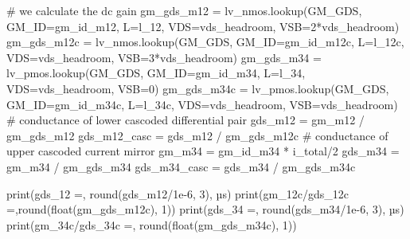 \documentclass[
  a4paper,
  DIV=11,
  numbers=noendperiod]{scrartcl}
\newenvironment{Shaded}{\begin{snugshade}}{\end{snugshade}}
\newcommand{\BuiltInTok}[1]{\textcolor[rgb]{0.00,0.23,0.31}{#1}}
\newcommand{\CommentTok}[1]{\textcolor[rgb]{0.37,0.37,0.37}{#1}}
\newcommand{\DecValTok}[1]{\textcolor[rgb]{0.68,0.00,0.00}{#1}}
\newcommand{\FloatTok}[1]{\textcolor[rgb]{0.68,0.00,0.00}{#1}}
\newcommand{\NormalTok}[1]{\textcolor[rgb]{0.00,0.23,0.31}{#1}}
\newcommand{\OperatorTok}[1]{\textcolor[rgb]{0.37,0.37,0.37}{#1}}
\newcommand{\StringTok}[1]{\textcolor[rgb]{0.13,0.47,0.30}{#1}}
\begin{document}
\begin{tcolorbox}
\begin{Shaded}
\begin{Highlighting}[]
\CommentTok{\# we calculate the dc gain}
\NormalTok{gm\_gds\_m12 }\OperatorTok{=}\NormalTok{ lv\_nmos.lookup(}\StringTok{\textquotesingle{}GM\_GDS\textquotesingle{}}\NormalTok{, GM\_ID}\OperatorTok{=}\NormalTok{gm\_id\_m12, L}\OperatorTok{=}\NormalTok{l\_12, VDS}\OperatorTok{=}\NormalTok{vds\_headroom, VSB}\OperatorTok{=}\DecValTok{2}\OperatorTok{*}\NormalTok{vds\_headroom)}
\NormalTok{gm\_gds\_m12c }\OperatorTok{=}\NormalTok{ lv\_nmos.lookup(}\StringTok{\textquotesingle{}GM\_GDS\textquotesingle{}}\NormalTok{, GM\_ID}\OperatorTok{=}\NormalTok{gm\_id\_m12c, L}\OperatorTok{=}\NormalTok{l\_12c, VDS}\OperatorTok{=}\NormalTok{vds\_headroom, VSB}\OperatorTok{=}\DecValTok{3}\OperatorTok{*}\NormalTok{vds\_headroom)}
\NormalTok{gm\_gds\_m34 }\OperatorTok{=}\NormalTok{ lv\_pmos.lookup(}\StringTok{\textquotesingle{}GM\_GDS\textquotesingle{}}\NormalTok{, GM\_ID}\OperatorTok{=}\NormalTok{gm\_id\_m34, L}\OperatorTok{=}\NormalTok{l\_34, VDS}\OperatorTok{=}\NormalTok{vds\_headroom, VSB}\OperatorTok{=}\DecValTok{0}\NormalTok{)}
\NormalTok{gm\_gds\_m34c }\OperatorTok{=}\NormalTok{ lv\_pmos.lookup(}\StringTok{\textquotesingle{}GM\_GDS\textquotesingle{}}\NormalTok{, GM\_ID}\OperatorTok{=}\NormalTok{gm\_id\_m34c, L}\OperatorTok{=}\NormalTok{l\_34c, VDS}\OperatorTok{=}\NormalTok{vds\_headroom, VSB}\OperatorTok{=}\NormalTok{vds\_headroom)}
\CommentTok{\# conductance of lower cascoded differential pair}
\NormalTok{gds\_m12 }\OperatorTok{=}\NormalTok{ gm\_m12 }\OperatorTok{/}\NormalTok{ gm\_gds\_m12}
\NormalTok{gds\_m12\_casc }\OperatorTok{=}\NormalTok{ gds\_m12 }\OperatorTok{/}\NormalTok{ gm\_gds\_m12c}
\CommentTok{\# conductance of upper cascoded current mirror}
\NormalTok{gm\_m34 }\OperatorTok{=}\NormalTok{ gm\_id\_m34 }\OperatorTok{*}\NormalTok{ i\_total}\OperatorTok{/}\DecValTok{2}
\NormalTok{gds\_m34 }\OperatorTok{=}\NormalTok{ gm\_m34 }\OperatorTok{/}\NormalTok{ gm\_gds\_m34}
\NormalTok{gds\_m34\_casc }\OperatorTok{=}\NormalTok{ gds\_m34 }\OperatorTok{/}\NormalTok{ gm\_gds\_m34c}

\BuiltInTok{print}\NormalTok{(}\StringTok{\textquotesingle{}gds\_12 =\textquotesingle{}}\NormalTok{, }\BuiltInTok{round}\NormalTok{(gds\_m12}\OperatorTok{/}\FloatTok{1e{-}6}\NormalTok{, }\DecValTok{3}\NormalTok{), }\StringTok{\textquotesingle{}µs\textquotesingle{}}\NormalTok{)}
\BuiltInTok{print}\NormalTok{(}\StringTok{\textquotesingle{}gm\_12c/gds\_12c =\textquotesingle{}}\NormalTok{,}\BuiltInTok{round}\NormalTok{(}\BuiltInTok{float}\NormalTok{(gm\_gds\_m12c), }\DecValTok{1}\NormalTok{))}
\BuiltInTok{print}\NormalTok{(}\StringTok{\textquotesingle{}gds\_34 =\textquotesingle{}}\NormalTok{, }\BuiltInTok{round}\NormalTok{(gds\_m34}\OperatorTok{/}\FloatTok{1e{-}6}\NormalTok{, }\DecValTok{3}\NormalTok{), }\StringTok{\textquotesingle{}µs\textquotesingle{}}\NormalTok{)}
\BuiltInTok{print}\NormalTok{(}\StringTok{\textquotesingle{}gm\_34c/gds\_34c =\textquotesingle{}}\NormalTok{, }\BuiltInTok{round}\NormalTok{(}\BuiltInTok{float}\NormalTok{(gm\_gds\_m34c), }\DecValTok{1}\NormalTok{))}


\end{Highlighting}
\end{Shaded}
\end{tcolorbox}
\end{document}
